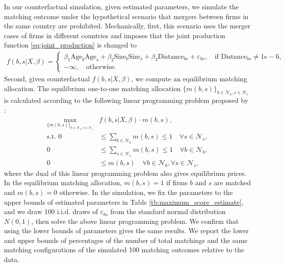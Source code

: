 \documentclass[10pt]{article}
\begin{document}
In our counterfactual simulation, given estimated parameters, we simulate the matching outcome under the hypothetical scenario that mergers between firms in the same country are prohibited. 
Mechanically, first, this scenario uses the merger cases of firms in different countries and imposes that the joint production function \eqref{eq:joint_production} is changed to
\begin{align*}
    f(b,s|X,\beta)= \begin{cases}
        \beta_1 \text{Age}_{b}\text{Age}_{s} + \beta_2 \text{Size}_{b}\text{Size}_{s} + \beta_3 \text{Distance}_{bs} + \varepsilon_{bs}, \quad \text{if }\text{Distance}_{bs}\neq 1e-6,\\
        -\infty, \quad \text{otherwise}.
    \end{cases}
\end{align*}
Second, given counterfactual $f(b,s|X,\beta)$, we compute an equilibrium matching allocation. 
The equilibrium one-to-one matching allocation $\{m(b,s)\}_{b\in\mathcal{N}_b,s\in\mathcal{N}_s}$ is calculated according to the following linear programming problem proposed by \cite{shapley1971assignment}:
\begin{align*}
    \max_{\{m(b,s)\}_{b\in\mathcal{N}_b,s\in\mathcal{N}_s}} &f(b,s|X,\beta)\cdot m(b,s),\\
    \text{s.t. } 0&\le \sum_{b\in\mathcal{N}_b}m(b,s)\le 1\quad  \forall s \in \mathcal{N}_s,\\
    0&\le \sum_{s\in\mathcal{N}_s}m(b,s)\le 1\quad \forall b \in \mathcal{N}_b,\\
    0&\le m(b,s) \quad \forall b \in \mathcal{N}_b,\forall s \in \mathcal{N}_s,
\end{align*}
where the dual of this linear programming problem also gives equilibrium prices. 
In the equilibrium matching allocation, $m(b,s) = 1$ if firms $b$ and $s$ are matched and $m(b,s) = 0$ otherwise.
In the simulation, we fix the parameters to the upper bounds of estimated parameters in Table \ref{tb:maximum_score_estimate}, and we draw 100 i.i.d. draws of $\varepsilon_{bs}$ from the standard normal distribution $N(0,1)$, then solve the above linear programming problem.
We confirm that using the lower bounds of parameters gives the same results.
We report the lower and upper bounds of percentages of the number of total matchings and the same matching configurations of the simulated 100 matching outcomes relative to the data.
\end{document}
